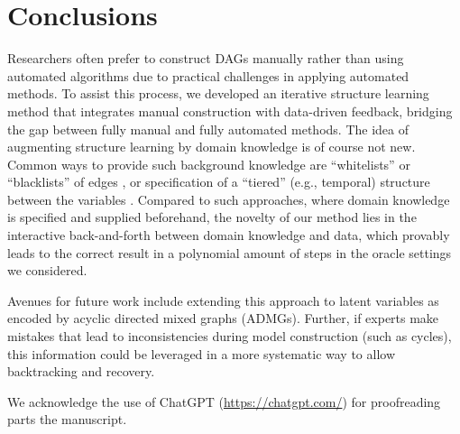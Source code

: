 \documentclass[accepted]{uai2025} %
\begin{document}
\section{Conclusions}

Researchers often prefer to construct DAGs manually rather than using automated
algorithms due to practical challenges in applying automated methods. To assist
this process, we developed an iterative structure learning method that
integrates manual construction with data-driven feedback, bridging
the gap between fully manual and fully automated methods.
The idea of augmenting structure learning by domain knowledge is of course not 
new. Common ways to provide such background knowledge are ``whitelists'' or 
``blacklists'' of edges 
\citep{scutari2010}, or specification
of a ``tiered'' (e.g., temporal) structure between the variables \citep{Bang2023}.
Compared to such approaches, where domain knowledge 
is specified and supplied beforehand, the novelty 
of our method lies in the interactive
back-and-forth between domain knowledge and data, 
which provably leads to the correct
result in a polynomial amount of steps in the oracle settings we considered.

Avenues for future work include extending this approach to latent variables 
as encoded by acyclic directed mixed graphs (ADMGs). Further, if experts make 
mistakes that lead to inconsistencies during model construction (such as cycles),
this information could be leveraged in a more systematic way to allow backtracking
and recovery.

\begin{acknowledgements} 
	We acknowledge the use of ChatGPT (\url{https://chatgpt.com/}) for
	proofreading parts the manuscript.
\end{acknowledgements}



\newpage


\end{document}
